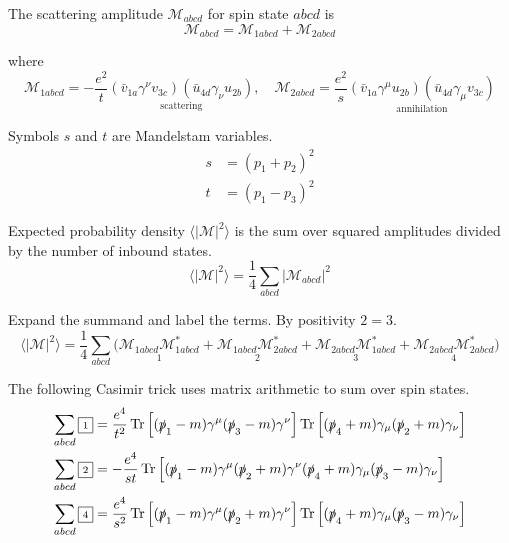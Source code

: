 The scattering amplitude $\mathcal M_{abcd}$ for spin state $abcd$ is
\begin{equation*}
\mathcal M_{abcd}=\mathcal M_{1abcd}+\mathcal M_{2abcd}
\end{equation*}

where
\begin{equation*}
\mathcal M_{1abcd}=-\frac{e^2}{t}
\underset{\text{scattering}}
{(\bar v_{1a}\gamma^\nu v_{3c})(\bar u_{4d}\gamma_\nu u_{2b})},
\quad
\mathcal M_{2abcd}=\frac{e^2}{s}
\underset{\text{annihilation}}
{(\bar v_{1a}\gamma^\mu u_{2b})(\bar u_{4d}\gamma_\mu v_{3c})}
\end{equation*}

Symbols $s$ and $t$ are Mandelstam variables.
\begin{align*}
s&=(p_1+p_2)^2
\\
t&=(p_1-p_3)^2
\end{align*}

Expected probability density $\langle|\mathcal M|^2\rangle$
is the sum over squared amplitudes divided by the number of inbound states.
\begin{equation*}
\langle|\mathcal M|^2\rangle=\frac{1}{4}\sum_{abcd}|\mathcal M_{abcd}|^2
\end{equation*}

Expand the summand and label the terms.
By positivity $\boxed{\scriptstyle2}=\boxed{\scriptstyle3}$.
\begin{equation*}
\langle|\mathcal{M}|^2\rangle=\frac{1}{4}
\sum_{abcd}
\bigl(
\underset{\boxed{\scriptstyle1}}{\mathcal M_{1abcd}\mathcal M_{1abcd}^*}+
\underset{\boxed{\scriptstyle2}}{\mathcal M_{1abcd}\mathcal M_{2abcd}^*}+
\underset{\boxed{\scriptstyle3}}{\mathcal M_{2abcd}\mathcal M_{1abcd}^*}+
\underset{\boxed{\scriptstyle4}}{\mathcal M_{2abcd}\mathcal M_{2abcd}^*}
\bigr)
\end{equation*}

The following Casimir trick uses matrix arithmetic to sum over spin states.
\begin{align*}
\sum_{abcd}{\boxed{\scriptstyle1}}
&=\frac{e^4}{t^2}\operatorname{Tr}\left[
(\slashed p_1-m)\gamma^\mu(\slashed p_3-m)\gamma^\nu
\right]
\operatorname{Tr}\left[
(\slashed p_4+m)\gamma_\mu(\slashed p_2+m)\gamma_\nu
\right]
\\
\sum_{abcd}{\boxed{\scriptstyle2}}
&=-\frac{e^4}{st}\operatorname{Tr}\left[
(\slashed p_1-m)\gamma^\mu(\slashed p_2+m)\gamma^\nu
(\slashed p_4+m)\gamma_\mu(\slashed p_3-m)\gamma_\nu
\right]
\\
\sum_{abcd}{\boxed{\scriptstyle4}}
&=\frac{e^4}{s^2}\operatorname{Tr}\left[
(\slashed p_1-m)\gamma^\mu(\slashed p_2+m)\gamma^\nu
\right]
\operatorname{Tr}\left[
(\slashed p_4+m)\gamma_\mu(\slashed p_3-m)\gamma_\nu
\right]
\end{align*}


